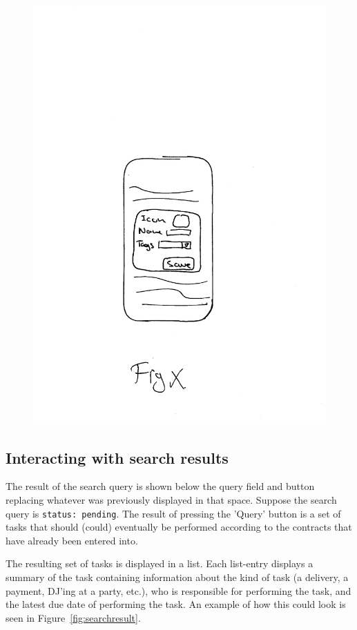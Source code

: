 \documentclass[envcountsame]{llncs}
\begin{document}
\begin{figure}[bth]
{    {\includegraphics[scale=0.80]{gfx/savesearchoverlay}}}
      \label{fig:first5}\caption{}
\end{figure}

\subsection{Interacting with search results}
\label{sec:interact-search-results}
The result of the search query is shown below the query field and
button replacing whatever was previously displayed in that
space. Suppose the search query is \texttt{status: pending}. The
result of pressing the 'Query' button is a set of tasks that should
(could) eventually be performed according to the contracts that have
already been entered into.

The resulting set of tasks is displayed in a list. Each list-entry
displays a summary of the task containing information about the kind
of task (a delivery, a payment, DJ'ing at a party, etc.), who is
responsible for performing the task, and the latest due date of
performing the task. An example of how this could look is seen in
Figure~\ref{fig:searchresult}.
\end{document}

